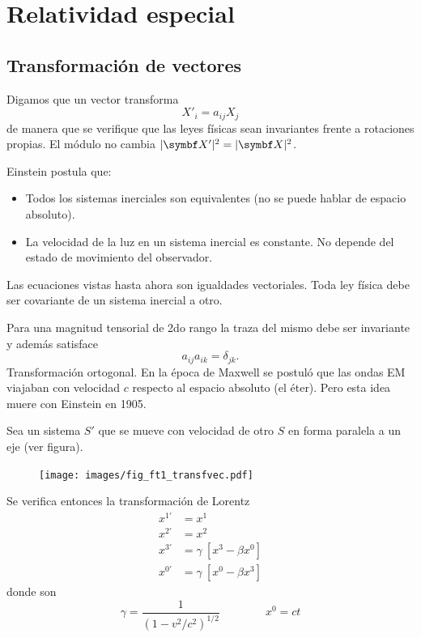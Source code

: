 \documentclass[10pt,oneside]{CBFT_book}
\begin{document}
\chapter{Relatividad especial}

\section{Transformación de vectores}

Digamos que un vector transforma 
\[
	X'_{i} = a_{ij} X_j
\]
de manera que se verifique que las leyes físicas sean invariantes frente a rotaciones propias.
El módulo no cambia $ |\vb{X}'|^ 2 = |\vb{X}|^2$.

Einstein postula que:
\begin{itemize}
 \item Todos los sistemas inerciales son equivalentes (no se puede hablar de espacio absoluto).
 \item La velocidad de la luz en un sistema inercial es constante. No depende del estado de
 movimiento del observador.
\end{itemize}



Las ecuaciones vistas hasta ahora son igualdades vectoriales.
Toda ley física debe ser covariante de un sistema inercial a otro.

Para una magnitud tensorial de 2do rango la traza del mismo debe ser invariante y además satisface
\[
	a_{ij} a_{ik} = \delta_{jk}.
\]
Transformación ortogonal.
En la época de Maxwell se postuló que las ondas EM viajaban con velocidad $c$ respecto al espacio absoluto
(el éter). Pero esta idea muere con Einstein en 1905.

Sea un sistema $S'$ que se mueve con velocidad  de otro $S$ en forma paralela a un eje (ver figura).
\begin{figure}[htb]
	\begin{center}
	\texttt{[image: images/fig\_ft1\_transfvec.pdf]}	 
	\end{center}
	\caption{}
\end{figure}

Se verifica entonces la transformación de Lorentz
\begin{align*}
	x^{1'} &= x^1  \\
	x^{2'} &= x^2  \\
	x^{3'} &= \gamma \: [ x^3 - \beta x^0]  \\
	x^{0'} &= \gamma \: [ x^0 - \beta x^3] 
\end{align*}
donde son 
\[
	\gamma = \frac{1}{(1 - v^2/c^2)^{1/2}} \qquad \qquad x^0 = ct 
\]
\end{document}
